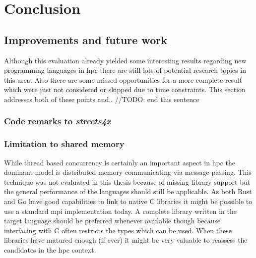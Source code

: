 \chapter{Conclusion}
\label{ch:Conclusion}


\section{Improvements and future work}
\label{sec:Conclusion::Improvements}

Although this evaluation already yielded some interesting results regarding new programming languages in \gls{hpc} there are still lots of potential research topics in this area. Also there are some missed opportunities for a more complete result which were just not considered or skipped due to time constraints. This section addresses both of these points and.. //TODO: end this sentence

\subsection{Code remarks to \textit{streets4x}}
\label{subsec:Conclusion::Improvements::CodeRemarks}



\subsection{Limitation to shared memory}
\label{subsec:Conclusion::Improvements::SharedMemory}

While thread based concurrency is certainly an important aspect in \gls{hpc} the dominant model is distributed memory communicating via message passing. This technique was not evaluated in this thesis because of missing library support but the general performance of the languages should still be applicable. As both Rust and Go have good capabilities to link to native C libraries it might be possible to use a standard \gls{mpi} implementation today. A complete library written in the target language should be preferred whenever available though because interfacing with C often restricts the types which can be used. When these libraries have matured enough (if ever) it might be very valuable to reassess the candidates in the \gls{hpc} context.

